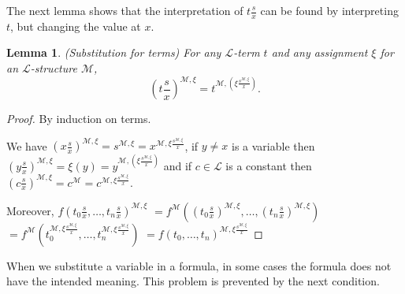 \documentclass[a4paper, 11pt]{amsart}
\newtheorem{lemma}[lemma]{Lemma}
\theoremstyle{remark}
\newcommand{\cL}{\mathcal L}
\newcommand{\cM}{\mathcal M}
\begin{document}
The next lemma shows that the interpretation of $t \frac{s}{x}$ can be found by interpreting $t$, but changing the value at $x$. 



\begin{lemma}(Substitution for terms) 
\label{terms under substitution} 
For any $\cL$-term $t$ and any assignment $\xi$ for an $\cL$-structure $\cM$, 
$$ (t \frac{s}{x})^{\cM,\xi} = t^{\cM,(\xi \frac{s^{\cM,\xi}}{x})}  .$$ 

\end{lemma} 
\begin{proof} 
By induction on terms. 

We have 
$ (x \frac{s}{x})^{\cM,\xi} = s^{\cM,\xi}= x^{\cM,\xi \frac{s^{\cM,\xi}}{x}}$, 
if  $y\neq x$ is a variable then 
$(y \frac{s}{x})^{\cM,\xi} = \xi(y) = y^{\cM,(\xi \frac{s^{\cM,\xi}}{x})}$ 
and if $c\in \cL$ is a constant then 
$ (c \frac{s}{x})^{\cM,\xi} = c^\cM= c^{\cM,\xi \frac{s^{\cM,\xi}}{x}} .$ 

Moreover, 
$f(t_0 \frac{s}{x},\dots,t_n \frac{s}{x})^{\cM,\xi}$ 
$=f^\cM((t_0 \frac{s}{x})^{\cM,\xi},\dots,(t_n \frac{s}{x})^{\cM,\xi})$ 
$=f^\cM(t_0^{\cM,\xi \frac{s^{\cM,\xi}}{x}},\dots, t_n^{\cM,\xi \frac{s^{\cM,\xi}}{x}})$ 
$=f(t_0 ,\dots,t_n )^{\cM,\xi\frac{s^{\cM,\xi}}{x}}$ 
\end{proof} 

When we substitute a variable in a formula, in some cases the formula does not have the intended meaning. 
This problem is prevented by the next condition. 
\end{document}
